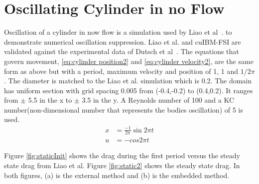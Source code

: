 \section{Oscillating Cylinder in no Flow}
\label{sec:Oscillating Cylinder in no Flow}
Oscillation of a cylinder in now flow is a simulation used by Liao et al~\cite{liao2010simulating}. to demonstrate numerical oscillation suppression. 
Liao et al. and cuIBM-FSI are validated against the experimental data of Dutsch et al~\cite{dutsch1998low}.
The equations that govern movement, \ref{eq:cylinder position2} and \ref{eq:cylinder velocity2}, are the same form as above but with a period, maximum velocity and position of 1, 1 and $1/2\pi$.
The diameter is matched to the Liao et al. simulation which is 0.2. 
The domain has uniform section with grid spacing 0.005 from (-0.4,-0.2) to (0.4,0.2). 
It ranges from $\pm$ 5.5 in the x to $\pm$ 3.5 in the y. 
A Reynolds number of 100 and a KC number(non-dimensional number that represents the bodies oscillation) of 5 is used.
\begin{align}
x&=\frac{-1}{2\pi}\sin{2\pi t}\label{eq:cylinder position2}\\
u&=-cos{2\pi t}\;\label{eq:cylinder velocity2}
\end{align}

Figure \ref{fig:staticInit} shows the drag during the first period versus the steady state drag from Liao et al. 
Figure \ref{fig:static2} shows the steady state drag.
In both figures, (a) is the external method and (b) is the embedded method.
 
